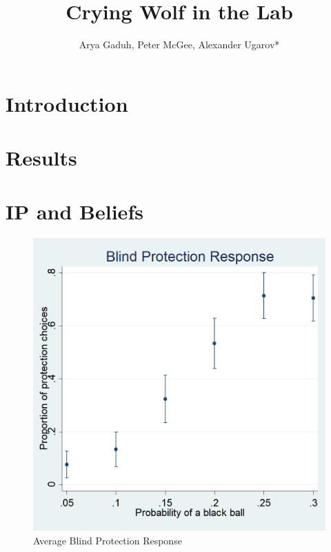 \documentclass[11pt,a4paper]{article}
\title{\Large Crying Wolf in the Lab\\}
\author{\large Arya Gaduh, Peter McGee, Alexander Ugarov*}
\begin{document}
\maketitle
\onehalfspacing
\begin{abstract}{ }


\vspace{10pt}
\begin{singlespace}

\end{singlespace}
\end{abstract}

\vspace{140pt}
\footnotesize






\onehalfspacing
\normalsize
\newpage
\section{Introduction}

\appendix


\section{Results}

\section{IP and Beliefs}
\begin{figure}[H]
\centering
\caption{Average Blind Protection Response} \label{Blind Protection Responses}

  \centering
  \includegraphics[scale=0.3]{Graphs/blind_prot_sta.png}

\end{figure}
\end{document}
